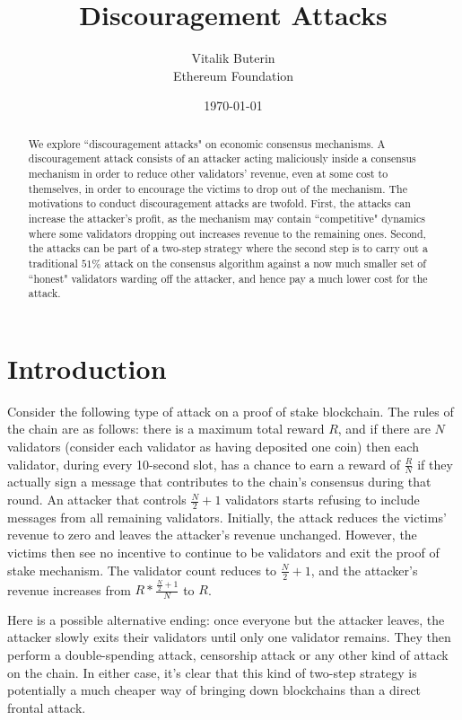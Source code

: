 \documentclass[12pt]{article}
\title{Discouragement Attacks}
\author{
        Vitalik Buterin \\
        Ethereum Foundation
}
\date{\today}
\begin{document}
\maketitle
\begin{abstract}
We explore ``discouragement attacks" on economic consensus mechanisms. A discouragement attack consists of an attacker acting maliciously inside a consensus mechanism in order to reduce other validators' revenue, even at some cost to themselves, in order to encourage the victims to drop out of the mechanism. The motivations to conduct discouragement attacks are twofold. First, the attacks can increase the attacker's profit, as the mechanism may contain ``competitive" dynamics where some validators dropping out increases revenue to the remaining ones. Second, the attacks can be part of a two-step strategy where the second step is to carry out a traditional $51\%$ attack on the consensus algorithm against a now much smaller set of ``honest" validators warding off the attacker, and hence pay a much lower cost for the attack.
\end{abstract}

\section{Introduction}
Consider the following type of attack on a proof of stake blockchain. The rules of the chain are as follows: there is a maximum total reward $R$, and if there are $N$ validators (consider each validator as having deposited one coin) then each validator, during every 10-second slot, has a chance to earn a reward of $\frac{R}{N}$ if they actually sign a message that contributes to the chain's consensus during that round. An attacker that controls $\frac{N}{2} + 1$ validators starts refusing to include messages from all remaining validators. Initially, the attack reduces the victims' revenue to zero and leaves the attacker's revenue unchanged. However, the victims then see no incentive to continue to be validators and exit the proof of stake mechanism. The validator count reduces to $\frac{N}{2} + 1$, and the attacker's revenue increases from $R * \frac{\frac{N}{2} + 1}{N}$ to $R$.

Here is a possible alternative ending: once everyone but the attacker leaves, the attacker slowly exits their validators until only one validator remains. They then perform a double-spending attack, censorship attack or any other kind of attack on the chain. In either case, it's clear that this kind of two-step strategy is potentially a much cheaper way of bringing down blockchains than a direct frontal attack.
\end{document}
